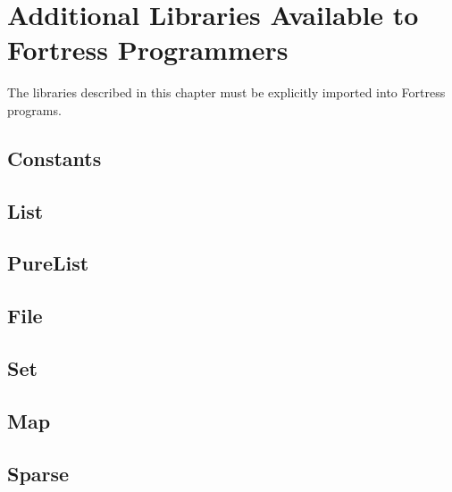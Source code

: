 %
%
%
%

\chapter{Additional Libraries Available to Fortress Programmers}

The libraries described in this chapter must be explicitly imported
into Fortress programs.

\section{Constants}



\section{List}



\section{PureList}



\section{File}



\section{Set}



\section{Map}



\section{Sparse}

